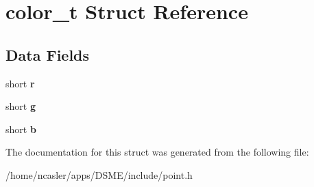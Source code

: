 \hypertarget{structcolor__t}{}\section{color\+\_\+t Struct Reference}
\label{structcolor__t}
\subsection*{Data Fields}
\begin{DoxyCompactItemize}
\item 
\hypertarget{structcolor__t_aab71f78fa178c16f0140c8341af7b8be}{}short {\bfseries r}\label{structcolor__t_aab71f78fa178c16f0140c8341af7b8be}

\item 
\hypertarget{structcolor__t_ae4a1617d1259807e30d9d28d094f9801}{}short {\bfseries g}\label{structcolor__t_ae4a1617d1259807e30d9d28d094f9801}

\item 
\hypertarget{structcolor__t_a1cf6659d939099119341ce3809a875f3}{}short {\bfseries b}\label{structcolor__t_a1cf6659d939099119341ce3809a875f3}

\end{DoxyCompactItemize}


The documentation for this struct was generated from the following file\+:\begin{DoxyCompactItemize}
\item 
/home/ncasler/apps/\+D\+S\+M\+E/include/point.\+h\end{DoxyCompactItemize}
